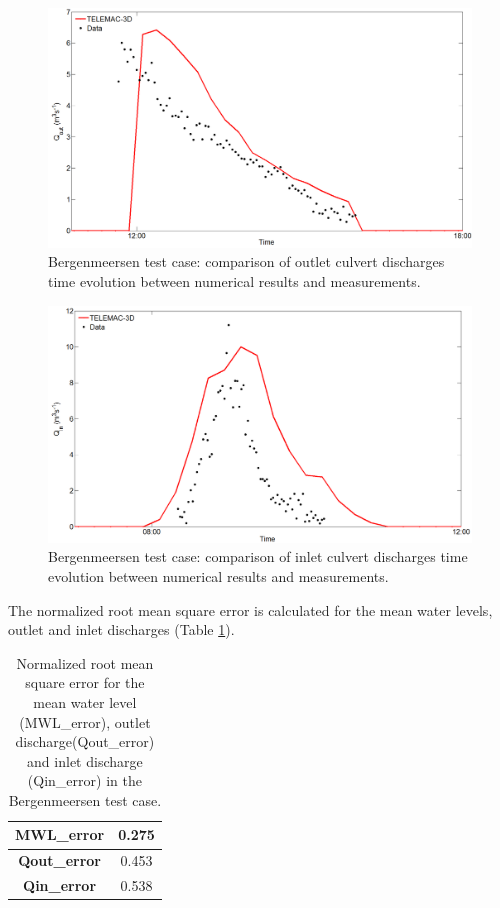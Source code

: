 \begin{figure}[H]
\begin{center}
  \includegraphics[scale=0.3]{img/figure7.png}
\end{center}
\caption{Bergenmeersen test case: comparison of outlet culvert discharges time evolution between numerical results and measurements.}
\label{fig:bergenmeersen_figure7}
\end{figure}
\begin{figure}[H]
\begin{center}
  \includegraphics[scale=0.3]{img/figure8.png}
\end{center}
\caption{Bergenmeersen test case: comparison of inlet culvert discharges time evolution between numerical results and measurements.}
\label{fig:bergenmeersen_figure8}
\end{figure}

The normalized root mean square error is calculated for the mean water levels, outlet and inlet discharges (Table \ref{tab:bergenmeersen_table3}).

\begin{table}[H]
\caption{Normalized root mean square error for the mean water level (MWL\_error),
outlet discharge(Qout\_error) and inlet discharge (Qin\_error)
in the Bergenmeersen test case.}\label{tab:bergenmeersen_table3}
\begin{center}\begin{tabular}{|c|c|}
\hline
\textbf{MWL\_error} & 0.275\\
\hline
\textbf{Qout\_error} & 0.453 \\
\hline
\textbf{Qin\_error} & 0.538 \\
\hline
\end{tabular}\end{center}
\end{table}

